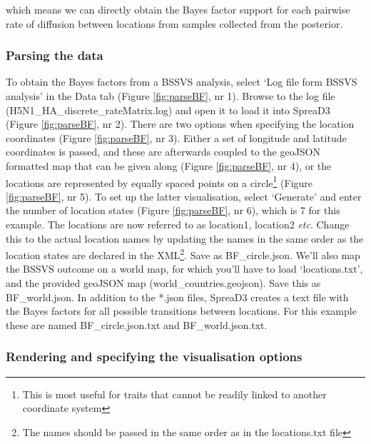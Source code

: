 \documentclass[english]{paper}
\def \spreadname {SpreaD3}
\begin{document}
\noindent
which means we can directly obtain the Bayes factor support for each pairwise rate of diffusion between locations from samples collected from the posterior. 

\subsubsection{Parsing the data}

To obtain the Bayes factors from a BSSVS analysis, select `Log file form BSSVS analysis' in the Data tab (Figure \ref{fig:parseBF}, nr 1).
Browse to the log file (H5N1\_HA\_discrete\_rateMatrix.log) and open it to load it into {\spreadname} (Figure \ref{fig:parseBF}, nr 2).
There are two options when specifying the location coordinates (Figure \ref{fig:parseBF}, nr 3).
Either a set of longitude and latitude coordinates is passed, and these are afterwards coupled to the geoJSON formatted map that can be given along (Figure \ref{fig:parseBF}, nr 4), or the locations are represented by equally spaced points on a circle\footnote{This is most useful for traits that cannot be readily linked to another coordinate system} (Figure \ref{fig:parseBF}, nr 5).
To set up the latter visualisation, select `Generate' and enter the number of location states (Figure \ref{fig:parseBF}, nr 6), which is 7 for this example.
The locations are now referred to as location1, location2 \textit{etc}. 
Change this to the actual location names by updating the names in the same order as the location states are declared in the XML\footnote{The names should be passed in the same order as in the locations.txt file}.
Save as BF\_circle.json.
We'll also map the BSSVS outcome on a world map, for which you'll have to load `locations.txt', and the provided geoJSON map (world\_countries.geojson).
Save this as BF\_world.json.
In addition to the *.json files, {\spreadname} creates a text file with the Bayes factors for all possible transitions between locations. 
For this example these are named BF\_circle.json.txt and BF\_world.json.txt.

\subsubsection{Rendering and specifying the visualisation options}
\end{document}
